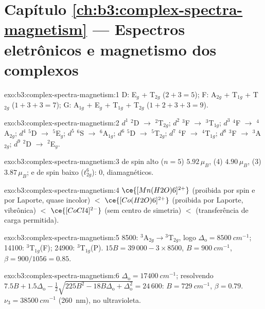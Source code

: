 \section*{Capítulo \ref{ch:b3:complex-spectra-magnetism} --- Espectros eletrônicos e magnetismo dos complexos}

\begin{solution}{exo:b3:complex-spectra-magnetism:1}
D: E$_g$ + T$_{2g}$ ($2 + 3 = 5$); F: A$_{2g}$ + T$_{1g}$ + T$_{2g}$ ($1 + 3 + 3 = 7$); G: A$_{1g}$ + E$_g$ + T$_{1g}$ + T$_{2g}$
($1 + 2 + 3 + 3 = 9$).
\end{solution}

\begin{solution}{exo:b3:complex-spectra-magnetism:2}
$d^1$ $^2$D $\to$ $^2$T$_{2g}$; $d^2$ $^3$F $\to$ $^3$T$_{1g}$; $d^3$ $^4$F $\to$ $^4$A$_{2g}$; $d^4$ $^5$D $\to$ $^5$E$_g$; $d^5$ $^6$S $\to$ $^6$A$_{1g}$; $d^6$ $^5$D
$\to$ $^5$T$_{2g}$; $d^7$ $^4$F $\to$ $^4$T$_{1g}$; $d^8$ $^3$F $\to$ $^3$A$_{2g}$; $d^9$ $^2$D $\to$ $^2$E$_g$.
\end{solution}

\begin{solution}{exo:b3:complex-spectra-magnetism:3}
 de spin alto ($n = 5$) $5.92\,\mu_B$,  (4) $4.90\,\mu_B$,  (3) $3.87\,\mu_B$;  e
 de spin baixo ($t_{2g}^6$): 0, diamagnéticos.
\end{solution}

\begin{solution}{exo:b3:complex-spectra-magnetism:4}
$\ce{[Mn(H2O)6]^{2+}}$ (proibida por spin e por Laporte, quase incolor) $<$ $\ce{[Co(H2O)6]^{2+}}$
(proibida por Laporte, vibrônica) $<$ $\ce{[CoCl4]^{2-}}$ (sem centro de simetria) $<$  (transferência
de carga permitida).
\end{solution}

\begin{solution}{exo:b3:complex-spectra-magnetism:5}
8500: $^3$A$_{2g}\to{}^3$T$_{2g}$, logo $\Delta_{\mathrm o} = \qty{8500}{cm^{-1}}$; 14100: $^3$T$_{1g}$(F); 24900: $^3$T$_{1g}$(P).
$15B = 39\,000 - 3 \times 8500$, $B = \qty{900}{cm^{-1}}$, $\beta = 900/1056 = 0.85$.
\end{solution}

\begin{solution}{exo:b3:complex-spectra-magnetism:6}
$\Delta_{\mathrm o} = \qty{17400}{cm^{-1}}$; resolvendo $7.5B + 1.5\Delta_{\mathrm o} - \frac12\sqrt{225B^2 - 18B\Delta_{\mathrm o} + \Delta_{\mathrm o}^2} = 24\,600$: $B = \qty{729}{cm^{-1}}$,
$\beta = 0.79$. $\nu_3 = \qty{38500}{cm^{-1}}$ (\qty{260}{nm}), no ultravioleta.
\end{solution}

